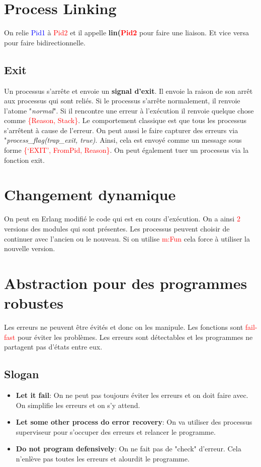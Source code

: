 \documentclass{report}
\begin{document}
\section{Process Linking}
On relie \textcolor{blue}{Pid1} à \textcolor{red}{Pid2} et il appelle \textbf{lin(\textcolor{red}{Pid2}} pour faire une liaison. Et vice versa pour faire bidirectionnelle.

\subsection{Exit}
Un processus s'arrête et envoie un \textbf{signal d'exit}. Il envoie la raison de son arrêt aux processus qui sont reliés. Si le processus s'arrête normalement, il renvoie l'atome "\textit{normal}". Si il rencontre une erreur à l'exécution il renvoie quelque chose comme \textcolor{red}{\{Reason, Stack\}}. Le comportement classique est que tous les processus s'arrêtent à cause de l'erreur. On peut aussi le faire capturer des erreurs via "\textit{process\_flag(trap\_exit, true)}. Ainsi, cela est envoyé comme un message sous forme \textcolor{red}{\{‘EXIT’, FromPid, Reason\}}. On peut également tuer un processus via la fonction exit.

\section{Changement dynamique}
On peut en Erlang modifié le code qui est en cours d'exécution. On a ainsi \textcolor{red}{2} versions des modules qui sont présentes. Les processus peuvent choisir de continuer avec l'ancien ou le nouveau. Si on utilise \textcolor{red}{m:Fun} cela force à utiliser la nouvelle version. 

\section{Abstraction pour des programmes robustes}
Les erreurs ne peuvent être évités et donc on les manipule. Les fonctions sont \textcolor{red}{fail-fast} pour éviter les problèmes. Les erreurs sont détectables et les programmes ne partagent pas d'états entre eux.

\subsection{Slogan}
\begin{itemize}
\item \textbf{Let it fail}: On ne peut pas toujours éviter les erreurs et on doit faire avec. On simplifie les erreurs et on s'y attend.
\item \textbf{Let some other process do error recovery}: On va utiliser des processus superviseur pour s'occuper des erreurs et relancer le programme. 
\item \textbf{Do not program defensively}: On ne fait pas de "check" d'erreur. Cela n'enlève pas toutes les erreurs et alourdit le programme.
\end{itemize}
\end{document}
